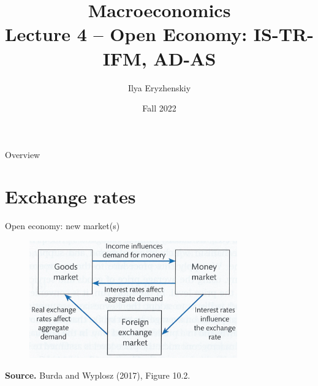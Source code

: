 \documentclass{beamer}
\title[PSME]{Macroeconomics\\ Lecture 4 -- Open Economy: IS-TR-IFM, AD-AS }
\author[I. Eryzhenskiy]{Ilya Eryzhenskiy}
\institute[BdF]{PSME Panth\'{e}on-Sorbonne Master in Economics}
\date[PSME macro]{Fall 2022}
\begin{document}
\begin{frame}
  \maketitle
\end{frame}

\begin{frame}{Overview}
  \tableofcontents
\end{frame}

\section{Exchange rates}

\begin{frame}{Open economy: new market(s)}
  \begin{figure}
	\centering
	\includegraphics[width=0.8\textwidth]{FIGURES/6_GE.png}
  \end{figure}
\begin{minipage}{1.0\columnwidth}
\tiny	
\textbf{Source.} Burda and Wyplosz (2017), Figure 10.2.\\
\end{minipage}
\end{frame}
\end{document}
